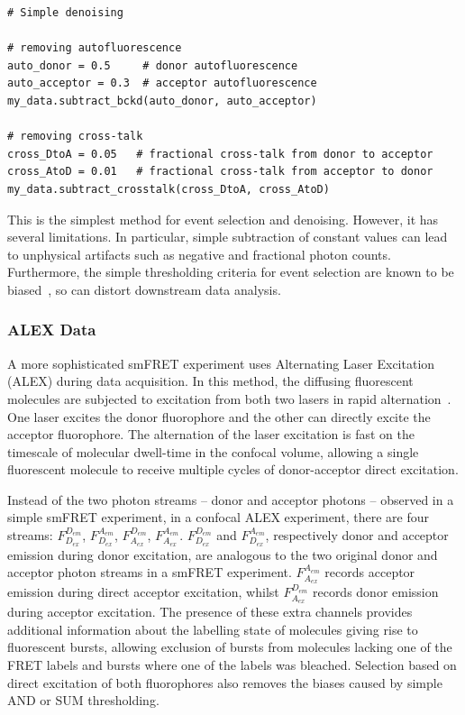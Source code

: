 \begin{lstlisting}
# Simple denoising

# removing autofluorescence
auto_donor = 0.5     # donor autofluorescence
auto_acceptor = 0.3  # acceptor autofluorescence
my_data.subtract_bckd(auto_donor, auto_acceptor)

# removing cross-talk
cross_DtoA = 0.05   # fractional cross-talk from donor to acceptor
cross_AtoD = 0.01   # fractional cross-talk from acceptor to donor
my_data.subtract_crosstalk(cross_DtoA, cross_AtoD)
\end{lstlisting}

This is the simplest method for event selection and denoising. However, it has several limitations. In particular, simple subtraction of constant values can lead to unphysical artifacts such as negative and fractional photon counts. Furthermore, the simple thresholding criteria for event selection are known to be biased~\cite{nir06}, so can distort downstream data analysis. 

\subsubsection*{ALEX Data}
A more sophisticated smFRET experiment uses Alternating Laser Excitation (ALEX) during data acquisition. In this method, the diffusing fluorescent molecules are subjected to excitation from both two lasers in rapid alternation~\cite{kapanidis05}. One laser excites the donor fluorophore and the other can directly excite the acceptor fluorophore. The alternation of the laser excitation is fast on the timescale of molecular dwell-time in the confocal volume, allowing a single fluorescent molecule to receive multiple cycles of donor-acceptor direct excitation.

Instead of the two photon streams -- donor and acceptor photons -- observed in a simple smFRET experiment, in a confocal ALEX experiment, there are four streams: $F_{D_{ex}}^{D_{em}}$, $F_{D_{ex}}^{A_{em}}$, $F_{A_{ex}}^{D_{em}}$, $F_{A_{ex}}^{A_{em}}$. $F_{D_{ex}}^{D_{em}}$ and $F_{D_{ex}}^{A_{em}}$, respectively donor and acceptor emission during donor excitation, are analogous to the two original donor and acceptor photon streams in a smFRET experiment. $F_{A_{ex}}^{A_{em}}$ records acceptor emission during direct acceptor excitation, whilst $F_{A_{ex}}^{D_{em}}$ records donor emission during acceptor excitation. The presence of these extra channels provides additional information about the labelling state of molecules giving rise to fluorescent bursts, allowing exclusion of bursts from molecules lacking one of the FRET labels and bursts where one of the labels was bleached. Selection based on direct excitation of both fluorophores also removes the biases caused by simple AND or SUM thresholding. 

